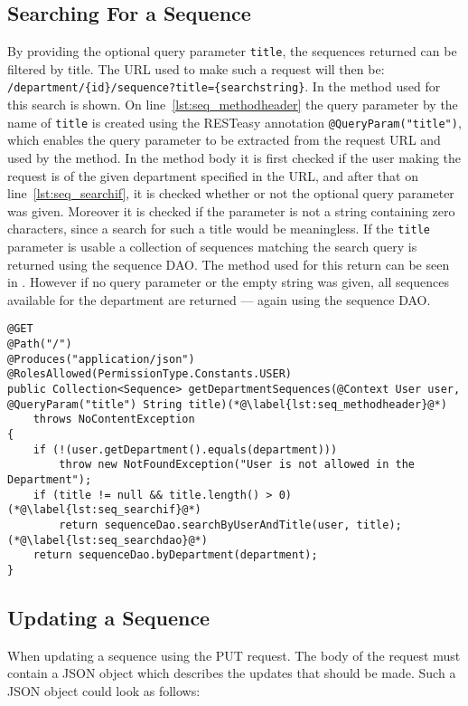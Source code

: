 \subsection{Searching For a Sequence}
By providing the optional query parameter \texttt{title}, the sequences returned can be filtered by title.
The URL used to make such a request will then be: \texttt{/department/\{id\}/sequence?title=\{searchstring\}}.
In  the method used for this search is shown.
On line~\ref{lst:seq_methodheader} the query parameter by the name of \texttt{title} is created using the RESTeasy annotation \texttt{@QueryParam("title")}, which enables the query parameter to be extracted from the request URL and used by the method.
In the method body it is first checked if the user making the request is of the given department specified in the URL, and after that on line~\ref{lst:seq_searchif}, it is checked whether or not the optional query parameter was given.
Moreover it is checked if the parameter is not a string containing zero characters, since a search for such a title would be meaningless.
If the \texttt{title} parameter is usable a collection of sequences matching the search query is returned using the sequence DAO.
The method used for this return can be seen in .
However if no query parameter or the empty string was given, all sequences available for the department are returned --- again using the sequence DAO.

\begin{lstlisting}[float, floatplacement=h, caption={The method which returns a list of sequences; and it can be filtered using a query parameter.}, label={lst:seq_serviceget}]
@GET
@Path("/")
@Produces("application/json")
@RolesAllowed(PermissionType.Constants.USER)
public Collection<Sequence> getDepartmentSequences(@Context User user, @QueryParam("title") String title)(*@\label{lst:seq_methodheader}@*)
    throws NoContentException
{
    if (!(user.getDepartment().equals(department)))
        throw new NotFoundException("User is not allowed in the Department");
    if (title != null && title.length() > 0)(*@\label{lst:seq_searchif}@*)
        return sequenceDao.searchByUserAndTitle(user, title);(*@\label{lst:seq_searchdao}@*)
    return sequenceDao.byDepartment(department);
}
\end{lstlisting}

\subsection{Updating a Sequence}
When updating a sequence using the PUT request.
The body of the request must contain a JSON object which describes the updates that should be made.
Such a JSON object could look as follows:

